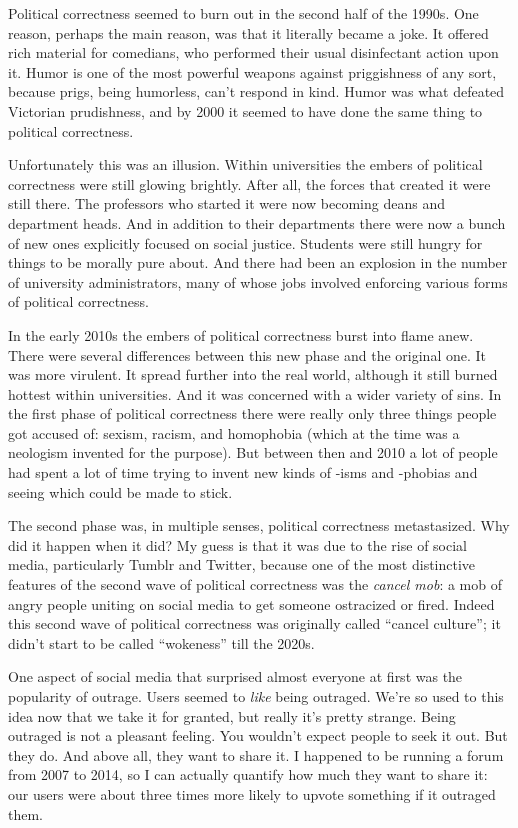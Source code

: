 Political correctness seemed to burn out in the second half of the
1990s. One reason, perhaps the main reason, was that it literally became
a joke. It offered rich material for comedians, who performed their
usual disinfectant action upon it. Humor is one of the most powerful
weapons against priggishness of any sort, because prigs, being
humorless, can't respond in kind. Humor was what defeated Victorian
prudishness, and by 2000 it seemed to have done the same thing to
political correctness.

Unfortunately this was an illusion. Within universities the embers of
political correctness were still glowing brightly. After all, the forces
that created it were still there. The professors who started it were now
becoming deans and department heads. And in addition to their
departments there were now a bunch of new ones explicitly focused on
social justice. Students were still hungry for things to be morally pure
about. And there had been an explosion in the number of university
administrators, many of whose jobs involved enforcing various forms of
political correctness.

In the early 2010s the embers of political correctness burst into flame
anew. There were several differences between this new phase and the
original one. It was more virulent. It spread further into the real
world, although it still burned hottest within universities. And it was
concerned with a wider variety of sins. In the first phase of political
correctness there were really only three things people got accused of:
sexism, racism, and homophobia (which at the time was a neologism
invented for the purpose). But between then and 2010 a lot of people had
spent a lot of time trying to invent new kinds of -isms and -phobias and
seeing which could be made to stick.

The second phase was, in multiple senses, political correctness
metastasized. Why did it happen when it did? My guess is that it was due
to the rise of social media, particularly Tumblr and Twitter, because
one of the most distinctive features of the second wave of political
correctness was the \emph{cancel mob}: a mob of angry people uniting on
social media to get someone ostracized or fired. Indeed this second wave
of political correctness was originally called ``cancel culture''; it
didn't start to be called ``wokeness'' till the 2020s.

One aspect of social media that surprised almost everyone at first was
the popularity of outrage. Users seemed to \emph{like} being outraged.
We're so used to this idea now that we take it for granted, but really
it's pretty strange. Being outraged is not a pleasant feeling. You
wouldn't expect people to seek it out. But they do. And above all, they
want to share it. I happened to be running a forum from 2007 to 2014, so
I can actually quantify how much they want to share it: our users were
about three times more likely to upvote something if it outraged them.

